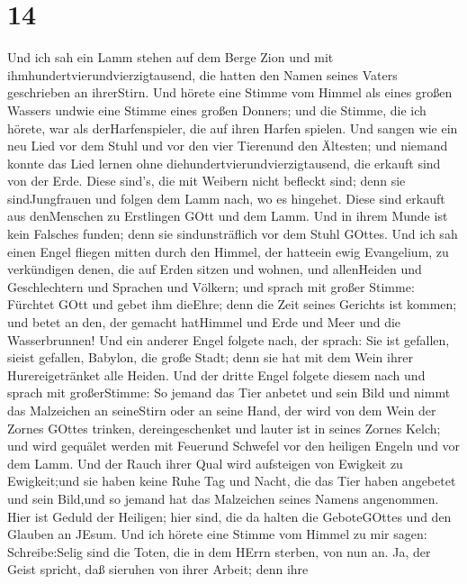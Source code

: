 \hypertarget{section-12}{%
\section{14}\label{section-12}}

 Und ich sah ein Lamm stehen auf dem Berge Zion und mit
ihmhundertvierundvierzigtausend, die hatten den Namen seines Vaters
geschrieben an ihrerStirn.  Und hörete eine Stimme vom
Himmel als eines großen Wassers undwie eine Stimme eines großen Donners;
und die Stimme, die ich hörete, war als derHarfenspieler, die auf ihren
Harfen spielen.  Und sangen wie ein neu Lied vor dem Stuhl
und vor den vier Tierenund den Ältesten; und niemand konnte das Lied
lernen ohne diehundertvierundvierzigtausend, die erkauft sind von der
Erde.  Diese sind's, die mit Weibern nicht befleckt sind;
denn sie sindJungfrauen und folgen dem Lamm nach, wo es hingehet. Diese
sind erkauft aus denMenschen zu Erstlingen GOtt und dem Lamm.
 Und in ihrem Munde ist kein Falsches funden; denn sie
sindunsträflich vor dem Stuhl GOttes.  Und ich sah einen
Engel fliegen mitten durch den Himmel, der hatteein ewig Evangelium, zu
verkündigen denen, die auf Erden sitzen und wohnen, und allenHeiden und
Geschlechtern und Sprachen und Völkern;  und sprach mit
großer Stimme: Fürchtet GOtt und gebet ihm dieEhre; denn die Zeit seines
Gerichts ist kommen; und betet an den, der gemacht hatHimmel und Erde
und Meer und die Wasserbrunnen!  Und ein anderer Engel
folgete nach, der sprach: Sie ist gefallen, sieist gefallen, Babylon,
die große Stadt; denn sie hat mit dem Wein ihrer Hurereigetränket alle
Heiden.  Und der dritte Engel folgete diesem nach und sprach
mit großerStimme: So jemand das Tier anbetet und sein Bild und nimmt das
Malzeichen an seineStirn oder an seine Hand,  der wird von
dem Wein der Zornes GOttes trinken, dereingeschenket und lauter ist in
seines Zornes Kelch; und wird gequälet werden mit Feuerund Schwefel vor
den heiligen Engeln und vor dem Lamm.  Und der Rauch ihrer
Qual wird aufsteigen von Ewigkeit zu Ewigkeit;und sie haben keine Ruhe
Tag und Nacht, die das Tier haben angebetet und sein Bild,und so jemand
hat das Malzeichen seines Namens angenommen.  Hier ist
Geduld der Heiligen; hier sind, die da halten die GeboteGOttes und den
Glauben an JEsum.  Und ich hörete eine Stimme vom Himmel zu
mir sagen: Schreibe:Selig sind die Toten, die in dem HErrn sterben, von
nun an. Ja, der Geist spricht, daß sieruhen von ihrer Arbeit; denn ihre
